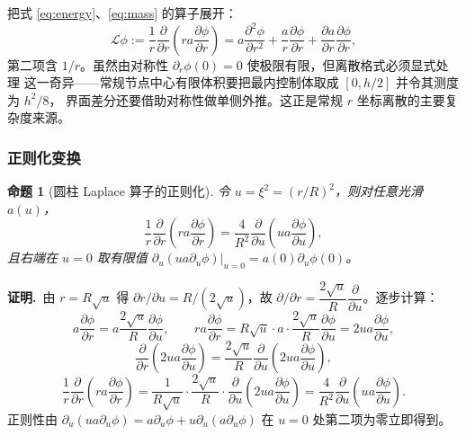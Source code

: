 \documentclass[withoutpreface,bwprint]{cumcmthesis}
\newtheorem{proposition}{命题}
\begin{document}
把式 \eqref{eq:energy}、\eqref{eq:mass} 的算子展开：
\begin{equation}
\mathcal{L}\phi:=\frac{1}{r}\frac{\partial}{\partial r}\left(ra\frac{\partial\phi}{\partial r}\right)
=a\frac{\partial^2\phi}{\partial r^2}+\frac{a}{r}\frac{\partial\phi}{\partial r}
+\frac{\partial a}{\partial r}\frac{\partial\phi}{\partial r},
\end{equation}
第二项含 $1/r$。虽然由对称性 $\partial_r\phi(0)=0$ 使极限有限，但离散格式必须显式处理
这一奇异——常规节点中心有限体积要把最内控制体取成 $[0,h/2]$ 并令其测度为 $h^2/8$，
界面差分还要借助对称性做单侧外推。这正是常规 $r$ 坐标离散的主要复杂度来源。

\subsubsection{正则化变换}

\begin{proposition}[圆柱 Laplace 算子的正则化]
令 $u=\xi^2=(r/R)^2$，则对任意光滑 $a(u)$，
\begin{equation}
\frac{1}{r}\frac{\partial}{\partial r}\left(ra\frac{\partial\phi}{\partial r}\right)
=\frac{4}{R^2}\frac{\partial}{\partial u}\left(ua\frac{\partial\phi}{\partial u}\right),
\label{eq:reg}
\end{equation}
且右端在 $u=0$ 取有限值 $\partial_u(ua\partial_u\phi)|_{u=0}=a(0)\partial_u\phi(0)$。
\end{proposition}
\noindent\textbf{证明.}\ 
由 $r=R\sqrt u$ 得 $\partial r/\partial u=R/(2\sqrt u)$，故
$\partial/\partial r=\dfrac{2\sqrt u}{R}\dfrac{\partial}{\partial u}$。逐步计算：
\[
a\frac{\partial\phi}{\partial r}=a\frac{2\sqrt u}{R}\frac{\partial\phi}{\partial u},
\qquad
ra\frac{\partial\phi}{\partial r}=R\sqrt u\cdot a\cdot\frac{2\sqrt u}{R}\frac{\partial\phi}{\partial u}
=2ua\frac{\partial\phi}{\partial u},
\]
\[
\frac{\partial}{\partial r}\left(2ua\frac{\partial\phi}{\partial u}\right)
=\frac{2\sqrt u}{R}\frac{\partial}{\partial u}\left(2ua\frac{\partial\phi}{\partial u}\right),
\]
\[
\frac{1}{r}\frac{\partial}{\partial r}\left(ra\frac{\partial\phi}{\partial r}\right)
=\frac{1}{R\sqrt u}\cdot\frac{2\sqrt u}{R}\cdot
\frac{\partial}{\partial u}\left(2ua\frac{\partial\phi}{\partial u}\right)
=\frac{4}{R^2}\frac{\partial}{\partial u}\left(ua\frac{\partial\phi}{\partial u}\right).
\]
正则性由 $\partial_u(ua\partial_u\phi)=a\partial_u\phi+u\partial_u(a\partial_u\phi)$
在 $u=0$ 处第二项为零立即得到。
\end{document}
